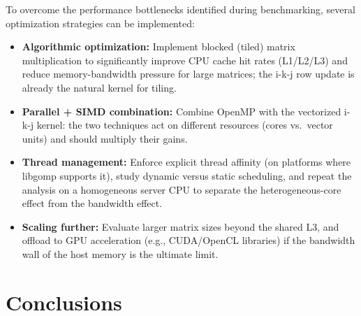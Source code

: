 \documentclass[12pt,a4paper]{article}
\begin{document}
To overcome the performance bottlenecks identified during benchmarking,
several optimization strategies can be implemented:
\begin{itemize}
\item \textbf{Algorithmic optimization:} Implement blocked (tiled) matrix
multiplication to significantly improve CPU cache hit rates (L1/L2/L3) and
reduce memory-bandwidth pressure for large matrices; the i-k-j row update is
already the natural kernel for tiling.
\item \textbf{Parallel + SIMD combination:} Combine OpenMP with the
vectorized i-k-j kernel: the two techniques act on different resources
(cores vs.\ vector units) and should multiply their gains.
\item \textbf{Thread management:} Enforce explicit thread affinity (on
platforms where libgomp supports it), study dynamic versus static
scheduling, and repeat the analysis on a homogeneous server CPU to separate
the heterogeneous-core effect from the bandwidth effect.
\item \textbf{Scaling further:} Evaluate larger matrix sizes beyond the
shared L3, and offload to GPU acceleration (e.g., CUDA/OpenCL libraries) if
the bandwidth wall of the host memory is the ultimate limit.
\end{itemize}

\section{Conclusions}
\label{sec:concl}
\end{document}

